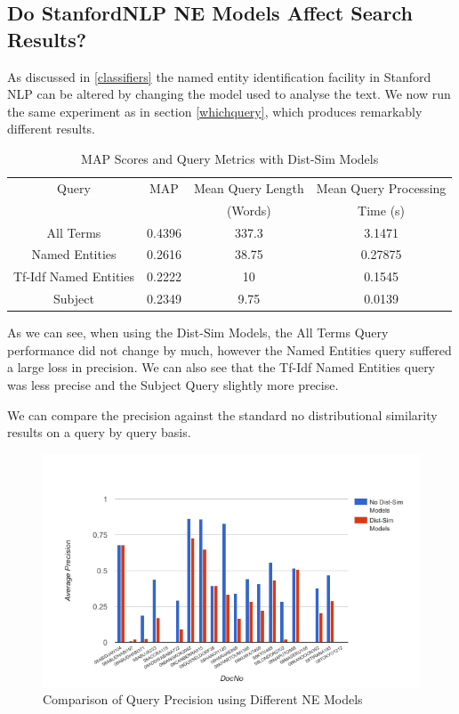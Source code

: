 \documentclass{l4proj}
\begin{document}
\subsection{Do StanfordNLP NE Models Affect Search Results?} \label{distsim}
As discussed in \ref{classifiers} the named entity identification facility in Stanford NLP can be altered by changing the model used to analyse the text. We now run the same experiment as in section \ref{whichquery}, which produces remarkably different results.
\begin{center}
\begin{table}[h]
\centering
\begin{tabular}{|c|c|c|c|}
\hline
Query                 & MAP    & Mean Query Length & Mean Query Processing \\ 
& & (Words) & Time (s) \\\hline
All Terms             & 0.4396 & 337.3             & 3.1471                       \\ \hline
Named Entities        & 0.2616 & 38.75             & 0.27875                         \\ \hline
Tf-Idf Named Entities & 0.2222 & 10                & 0.1545                       \\ \hline
Subject               & 0.2349 & 9.75              & 0.0139                        \\ \hline
\end{tabular}
\caption{MAP Scores and Query Metrics with Dist-Sim Models}
\label{results}
\end{table}
\end{center}
As we can see, when using the Dist-Sim Models, the All Terms Query performance did not change by much, however the Named Entities query suffered a large loss in precision. We can also see that the Tf-Idf Named Entities query was less precise and the Subject Query slightly more precise.

We can compare the precision against the standard no distributional similarity results on a query by query basis.

\begin{figure}[H]
\centering
\includegraphics[scale=0.60]{images/query_by_query}
\caption{Comparison of Query Precision using Different NE Models}
\label{query_by_query}
\end{figure}
\end{document}
